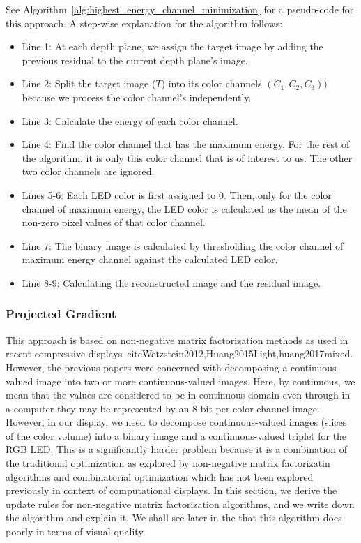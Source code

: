 See Algorithm~\ref{alg:highest_energy_channel_minimization} for a pseudo-code for this approach. A step-wise explanation for the algorithm follows:
\begin{itemize}
    \item Line 1: At each depth plane, we assign the target image by adding the previous residual to the current depth plane's image. 
    \item Line 2: Split the target image ($T$) into its color channels $(C_1, C_2, C_3))$ because we process the color channel's independently.
    \item Line 3: Calculate the energy of each color channel.
    \item Line 4: Find the color channel that has the maximum energy. For the rest of the algorithm, it is only this color channel that is of interest to us. The other two color channels are ignored.
    \item Lines 5-6: Each LED color is first assigned to 0. Then, only for the color channel of maximum energy, the LED color is calculated as the mean of the non-zero pixel values of that color channel.
    \item Line 7: The binary image is calculated by thresholding the color channel of maximum energy channel against the calculated LED color.
    \item Line 8-9: Calculating the reconstructed image and the residual image.
 \end{itemize}


\subsubsection{Projected Gradient}
\label{sec:acd_projected_gradient}
This approach is based on non-negative matrix factorization methods as used in recent compressive displays~cite{Wetzstein2012,Huang2015Light,huang2017mixed}. 
However, the previous papers were concerned with decomposing a continuous-valued image into two or more continuous-valued images. 
Here, by continuous, we mean that the values are considered to be in continuous domain even through in a computer they may be represented by an 8-bit per color channel image. 
However, in our display, we need to decompose continuous-valued images (slices of the color volume) into a binary image and a continuous-valued triplet for the RGB LED. 
This is a significantly harder problem because it is a combination of the traditional optimization as explored by non-negative matrix factorizatin algorithms and combinatorial optimization which has not been explored previously in context of computational displays. 
In this section, we derive the update rules for non-negative matrix factorization algorithms, and we write down the algorithm and explain it.
We shall see later in the  that this algorithm does poorly in terms of visual quality.

